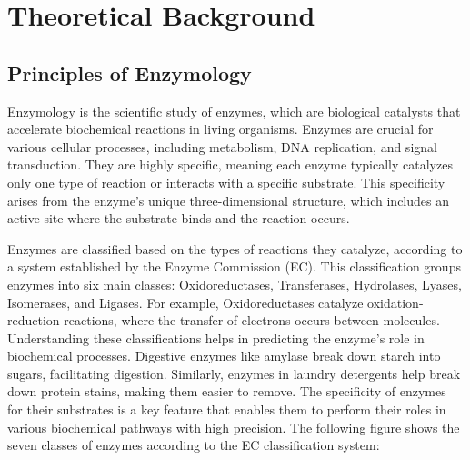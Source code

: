 \section{Theoretical Background}

\subsection{Principles of Enzymology}
\label{sec:Principles of Enzymology}

Enzymology is the scientific study of enzymes, which are biological catalysts that accelerate biochemical reactions in living organisms. Enzymes are crucial for various cellular processes, including metabolism, DNA replication, and signal transduction. They are highly specific, meaning each enzyme typically catalyzes only one type of reaction or interacts with a specific substrate. This specificity arises from the enzyme’s unique three-dimensional structure, which includes an active site where the substrate binds and the reaction occurs.
\autocite{robinsonEnzymesPrinciplesBiotechnological2015}

Enzymes are classified based on the types of reactions they catalyze, according to a system established by the Enzyme Commission (EC). This classification groups enzymes into six main classes: Oxidoreductases, Transferases, Hydrolases, Lyases, Isomerases, and Ligases. For example, Oxidoreductases catalyze oxidation-reduction reactions, where the transfer of electrons occurs between molecules. Understanding these classifications helps in predicting the enzyme’s role in biochemical processes. Digestive enzymes like amylase break down starch into sugars, facilitating digestion. Similarly, enzymes in laundry detergents help break down protein stains, making them easier to remove. The specificity of enzymes for their substrates is a key feature that enables them to perform their roles in various biochemical pathways with high precision. The following figure shows the seven classes of enzymes according to the EC classification system:

